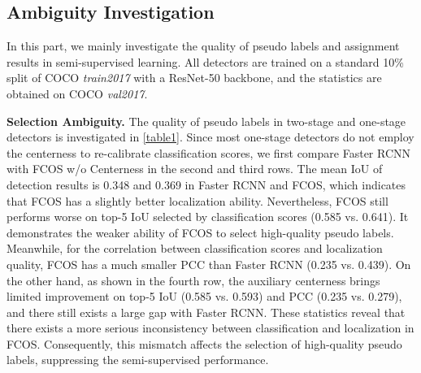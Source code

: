 \documentclass[10pt,twocolumn,letterpaper]{article}
\begin{document}
\begin{table}[t]
    \caption{Comparison on pseudo labels predicted by Faster RCNN and FCOS. 'vanilla FCOS' denotes the FCOS without the centerness branch. 'Top-5 IoU' represents the mean IoU of top-5 detection results based on classification scores in each image. 'PCC' represents the Pearson Correlation Coefficient between the normalized classification scores and localization quality.}
\centering
    \label{table1}
\end{table}



\subsection{Ambiguity Investigation}
\label{sec3.2}

In this part, we mainly investigate the quality of pseudo labels and assignment results in semi-supervised learning.
All detectors are trained on a standard 10\% split of COCO \emph{train2017} with a ResNet-50\cite{ResNet} backbone, and the statistics are obtained on COCO \emph{val2017}.

\noindent\textbf{Selection Ambiguity.}
The quality of pseudo labels in two-stage and one-stage detectors is investigated in \cref{table1}.
Since most one-stage detectors do not employ the centerness to re-calibrate classification scores, we first compare Faster RCNN with FCOS w/o Centerness in the second and third rows.
The mean IoU of detection results is 0.348 and 0.369 in Faster RCNN and FCOS, which indicates that FCOS has a slightly better localization ability.
Nevertheless, FCOS still performs worse on top-5 IoU selected by classification scores (0.585 vs. 0.641).
It demonstrates the weaker ability of FCOS to select high-quality pseudo labels.
Meanwhile, for the correlation between classification scores and localization quality, FCOS has a much smaller PCC than Faster RCNN (0.235 vs. 0.439).
On the other hand, as shown in the fourth row, the auxiliary centerness brings limited improvement on top-5 IoU (0.585 vs. 0.593) and PCC (0.235 vs. 0.279), and there still exists a large gap with Faster RCNN.
These statistics reveal that there exists a more serious inconsistency between classification and localization in FCOS.
Consequently, this mismatch affects the selection of high-quality pseudo labels, suppressing the semi-supervised performance.
\end{document}
